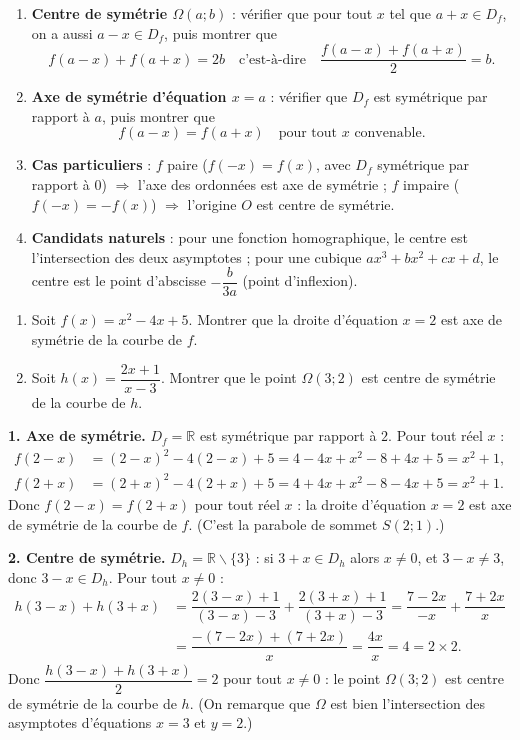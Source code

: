 \documentclass[11pt]{article}
\def\setminus{\mathbin{\backslash}}\let\smallsetminus\setminus
\begin{document}
\begin{methode}
\begin{enumerate}
\item \textbf{Centre de symétrie $\Omega(a;b)$} : vérifier que pour tout $x$ tel que $a+x\in D_f$, on a aussi $a-x\in D_f$, puis montrer que
\[f(a-x)+f(a+x)=2b \quad \text{c'est-à-dire} \quad \dfrac{f(a-x)+f(a+x)}{2}=b.\]
\item \textbf{Axe de symétrie d'équation $x=a$} : vérifier que $D_f$ est symétrique par rapport à $a$, puis montrer que
\[f(a-x)=f(a+x) \quad \text{pour tout } x \text{ convenable.}\]
\item \textbf{Cas particuliers} : $f$ paire ($f(-x)=f(x)$, avec $D_f$ symétrique par rapport à $0$) $\Rightarrow$ l'axe des ordonnées est axe de symétrie ; $f$ impaire ($f(-x)=-f(x)$) $\Rightarrow$ l'origine $O$ est centre de symétrie.
\item \textbf{Candidats naturels} : pour une fonction homographique, le centre est l'intersection des deux asymptotes ; pour une cubique $ax^3+bx^2+cx+d$, le centre est le point d'abscisse $-\dfrac{b}{3a}$ (point d'inflexion).
\end{enumerate}
\end{methode}

\begin{exoresolu}
\begin{enumerate}
\item Soit $f(x)=x^2-4x+5$. Montrer que la droite d'équation $x=2$ est axe de symétrie de la courbe de $f$.
\item Soit $h(x)=\dfrac{2x+1}{x-3}$. Montrer que le point $\Omega(3;2)$ est centre de symétrie de la courbe de $h$.
\end{enumerate}
\tcblower
\textbf{1. Axe de symétrie.} $D_f=\mathbb{R}$ est symétrique par rapport à $2$. Pour tout réel $x$ :
\begin{align*}
f(2-x)&=(2-x)^2-4(2-x)+5=4-4x+x^2-8+4x+5=x^2+1,\\
f(2+x)&=(2+x)^2-4(2+x)+5=4+4x+x^2-8-4x+5=x^2+1.
\end{align*}
Donc $f(2-x)=f(2+x)$ pour tout réel $x$ : la droite d'équation $\boxed{x=2}$ est axe de symétrie de la courbe de $f$. (C'est la parabole de sommet $S(2;1)$.)

\textbf{2. Centre de symétrie.} $D_h=\mathbb{R}\setminus\{3\}$ : si $3+x\in D_h$ alors $x\neq 0$, et $3-x\neq 3$, donc $3-x\in D_h$. Pour tout $x\neq 0$ :
\begin{align*}
h(3-x)+h(3+x)&=\dfrac{2(3-x)+1}{(3-x)-3}+\dfrac{2(3+x)+1}{(3+x)-3}=\dfrac{7-2x}{-x}+\dfrac{7+2x}{x}\\
&=\dfrac{-(7-2x)+(7+2x)}{x}=\dfrac{4x}{x}=4=2\times 2.
\end{align*}
Donc $\dfrac{h(3-x)+h(3+x)}{2}=2$ pour tout $x\neq 0$ : le point $\boxed{\Omega(3;2)}$ est centre de symétrie de la courbe de $h$. (On remarque que $\Omega$ est bien l'intersection des asymptotes d'équations $x=3$ et $y=2$.)
\end{exoresolu}
\end{document}
